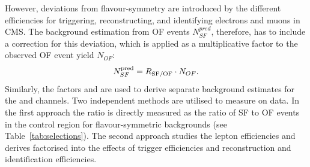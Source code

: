 However, deviations from flavour-symmetry are introduced by the different efficiencies for triggering, reconstructing, and identifying electrons and muons in CMS. The background estimation from OF events $N_{SF}^{pred}$, therefore, has to include a correction for this deviation, which is applied as a multiplicative factor to the observed OF event yield $N_{OF}$:
\begin{equation*}
N_{SF}^{\text{pred}} = R_{\text{SF/OF}} \cdot N_{OF}.
\end{equation*}
Similarly, the factors \Reeof and \Rmmof are used to derive separate background estimates for the \EE and \MM channels. Two independent methods are utilised to measure \Rsfof on data. In the first approach the ratio is directly measured as the ratio of SF to OF events in the control region for flavour-symmetric backgrounds (see Table~\ref{tab:selections}). The second approach studies the lepton efficiencies and derives \Rsfof factorised into the effects of trigger efficiencies and reconstruction and identification efficiencies. 

